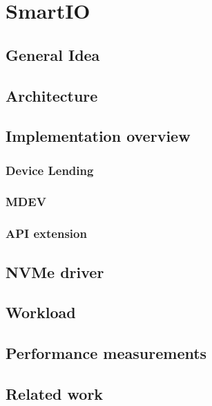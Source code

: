 \chapter{SmartIO}\label{sec:smartio}

\section{General Idea }
\section{Architecture}

\section{Implementation overview}
\subsection{Device Lending}
\subsection{MDEV}
\subsection{API extension}

\section{NVMe driver}

\section{Workload}

\section{Performance measurements}

\section{Related work}
